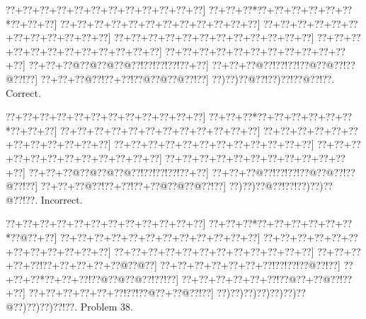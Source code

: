 \documentclass[a5paper]{article}
\begin{document}
\begin{center}
{\goo
\0??+\0??+\0??+\0??+\0??+\0??+\0??+\0??+\0??+\0??+\0??+\0??]
\0??+\0??+\0??*\0??+\0??+\0??+\0??+\0??+\0??*\0??+\0??+\0??]
\0??+\0??+\0??+\0??+\0??+\0??+\0??+\0??+\0??+\0??+\0??+\0??]
\0??+\0??+\0??+\0??+\0??+\0??+\0??+\0??+\0??+\0??+\0??+\0??]
\0??+\0??+\0??+\0??+\0??+\0??+\0??+\0??+\0??+\0??+\0??+\0??]
\0??+\0??+\0??+\0??+\0??+\0??+\0??+\0??+\0??+\0??+\0??+\0??]
\0??+\0??+\0??+\0??+\0??+\0??+\0??+\0??+\0??+\0??+\0??+\0??]
\0??+\0??+\0??@\0??@\0??@\0??@\0??!\0??!\0??!\0??!\0??+\0??]
\0??+\0??+\0??@\0??!\0??!\0??!\0??@\0??@\0??!\0??@\0??!\0??]
\0??+\0??+\0??@\0??!\0??+\0??!\0??@\0??@\0??@\0??!\0??]
\0??)\0??)\0??@\0??!\0??)\0??!\0??@\0??!\0??.
}
Correct. 

\end{center}
\begin{center}
{\goo
\0??+\0??+\0??+\0??+\0??+\0??+\0??+\0??+\0??+\0??+\0??+\0??]
\0??+\0??+\0??*\0??+\0??+\0??+\0??+\0??+\0??*\0??+\0??+\0??]
\0??+\0??+\0??+\0??+\0??+\0??+\0??+\0??+\0??+\0??+\0??+\0??]
\0??+\0??+\0??+\0??+\0??+\0??+\0??+\0??+\0??+\0??+\0??+\0??]
\0??+\0??+\0??+\0??+\0??+\0??+\0??+\0??+\0??+\0??+\0??+\0??]
\0??+\0??+\0??+\0??+\0??+\0??+\0??+\0??+\0??+\0??+\0??+\0??]
\0??+\0??+\0??+\0??+\0??+\0??+\0??+\0??+\0??+\0??+\0??+\0??]
\0??+\0??+\0??@\0??@\0??@\0??@\0??!\0??!\0??!\0??!\0??+\0??]
\0??+\0??+\0??@\0??!\0??!\0??!\0??@\0??@\0??!\0??@\0??!\0??]
\0??+\0??+\0??@\0??!\0??+\0??!\0??+\0??@\0??@\0??@\0??!\0??]
\0??)\0??)\0??@\0??!\0??!\0??)\0??)\0??@\0??!\0??.
}
Incorrect. 

\end{center}
\newpage
\begin{center}
{\goo
\0??+\0??+\0??+\0??+\0??+\0??+\0??+\0??+\0??+\0??+\0??+\0??]
\0??+\0??+\0??*\0??+\0??+\0??+\0??+\0??+\0??*\0??@\0??+\0??]
\0??+\0??+\0??+\0??+\0??+\0??+\0??+\0??+\0??+\0??+\0??+\0??]
\0??+\0??+\0??+\0??+\0??+\0??+\0??+\0??+\0??+\0??+\0??+\0??]
\0??+\0??+\0??+\0??+\0??+\0??+\0??+\0??+\0??+\0??+\0??+\0??]
\0??+\0??+\0??+\0??+\0??!\0??+\0??+\0??+\0??+\0??@\0??@\0??]
\0??+\0??+\0??+\0??+\0??+\0??+\0??!\0??!\0??!\0??@\0??!\0??]
\0??+\0??+\0??*\0??+\0??+\0??!\0??@\0??@\0??@\0??!\0??!\0??]
\0??+\0??+\0??+\0??+\0??+\0??!\0??@\0??+\0??@\0??!\0??+\0??]
\0??+\0??+\0??+\0??+\0??+\0??!\0??!\0??@\0??+\0??@\0??!\0??]
\0??)\0??)\0??)\0??)\0??)\0??)\0??@\0??)\0??)\0??)\0??!\0??.
}
Problem 38.

\end{center}
\end{document}
